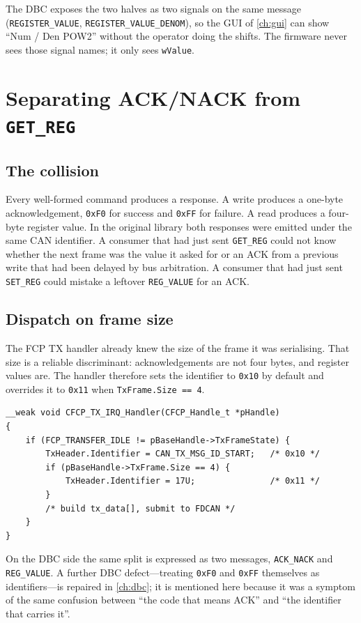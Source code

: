 The DBC exposes the two halves as two signals on the same message
(\texttt{REGISTER\_VALUE}, \texttt{REGISTER\_VALUE\_DENOM}), so the GUI of
\cref{ch:gui} can show ``Num / Den POW2'' without the operator doing the
shifts. The firmware never sees those signal names; it only sees
\texttt{wValue}.

\section{Separating ACK/NACK from \texttt{GET\_REG}}
\label{sec:ack}

\subsection{The collision}
Every well-formed command produces a response. A write produces a one-byte
acknowledgement, \texttt{0xF0} for success and \texttt{0xFF} for failure.
A read produces a four-byte register value. In the original library both
responses were emitted under the same CAN identifier. A consumer that had
just sent \texttt{GET\_REG} could not know whether the next frame was the
value it asked for or an ACK from a previous write that had been delayed
by bus arbitration. A consumer that had just sent \texttt{SET\_REG} could
mistake a leftover \texttt{REG\_VALUE} for an ACK.

\subsection{Dispatch on frame size}
The FCP TX handler already knew the size of the frame it was serialising.
That size is a reliable discriminant: acknowledgements are not four bytes,
and register values are. The handler therefore sets the identifier to
\texttt{0x10} by default and overrides it to \texttt{0x11} when
\texttt{TxFrame.Size == 4}.

\begin{lstlisting}[style=cstyle,caption={Identifier selection in CFCP\_TX\_IRQ\_Handler.},label=lst:ack]
__weak void CFCP_TX_IRQ_Handler(CFCP_Handle_t *pHandle)
{
    if (FCP_TRANSFER_IDLE != pBaseHandle->TxFrameState) {
        TxHeader.Identifier = CAN_TX_MSG_ID_START;   /* 0x10 */
        if (pBaseHandle->TxFrame.Size == 4) {
            TxHeader.Identifier = 17U;               /* 0x11 */
        }
        /* build tx_data[], submit to FDCAN */
    }
}
\end{lstlisting}

On the DBC side the same split is expressed as two messages,
\texttt{ACK\_NACK} and \texttt{REG\_VALUE}. A further DBC defect---treating
\texttt{0xF0} and \texttt{0xFF} themselves as identifiers---is repaired in
\cref{ch:dbc}; it is mentioned here because it was a symptom of the same
confusion between ``the code that means ACK'' and ``the identifier that
carries it''.

